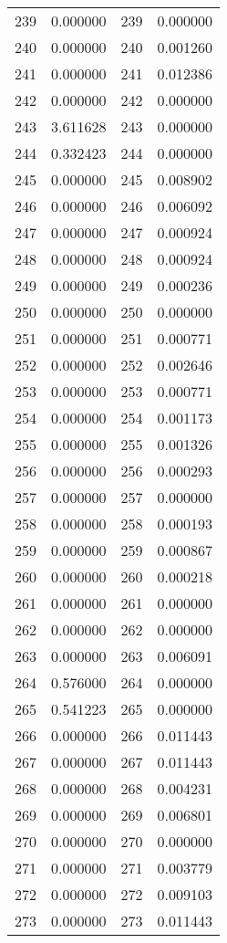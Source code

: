 \documentclass[12pt]{article}
\begin{document}
\begin{longtable}{@{}cccc@{}}
239 & 0.000000 & 239 & 0.000000 \\
240 & 0.000000 & 240 & 0.001260 \\
241 & 0.000000 & 241 & 0.012386 \\
242 & 0.000000 & 242 & 0.000000 \\
243 & 3.611628 & 243 & 0.000000 \\
244 & 0.332423 & 244 & 0.000000 \\
245 & 0.000000 & 245 & 0.008902 \\
246 & 0.000000 & 246 & 0.006092 \\
247 & 0.000000 & 247 & 0.000924 \\
248 & 0.000000 & 248 & 0.000924 \\
249 & 0.000000 & 249 & 0.000236 \\
250 & 0.000000 & 250 & 0.000000 \\
251 & 0.000000 & 251 & 0.000771 \\
252 & 0.000000 & 252 & 0.002646 \\
253 & 0.000000 & 253 & 0.000771 \\
254 & 0.000000 & 254 & 0.001173 \\
255 & 0.000000 & 255 & 0.001326 \\
256 & 0.000000 & 256 & 0.000293 \\
257 & 0.000000 & 257 & 0.000000 \\
258 & 0.000000 & 258 & 0.000193 \\
259 & 0.000000 & 259 & 0.000867 \\
260 & 0.000000 & 260 & 0.000218 \\
261 & 0.000000 & 261 & 0.000000 \\
262 & 0.000000 & 262 & 0.000000 \\
263 & 0.000000 & 263 & 0.006091 \\
264 & 0.576000 & 264 & 0.000000 \\
265 & 0.541223 & 265 & 0.000000 \\
266 & 0.000000 & 266 & 0.011443 \\
267 & 0.000000 & 267 & 0.011443 \\
268 & 0.000000 & 268 & 0.004231 \\
269 & 0.000000 & 269 & 0.006801 \\
270 & 0.000000 & 270 & 0.000000 \\
271 & 0.000000 & 271 & 0.003779 \\
272 & 0.000000 & 272 & 0.009103 \\
273 & 0.000000 & 273 & 0.011443 \\

\end{longtable}
\end{document}
